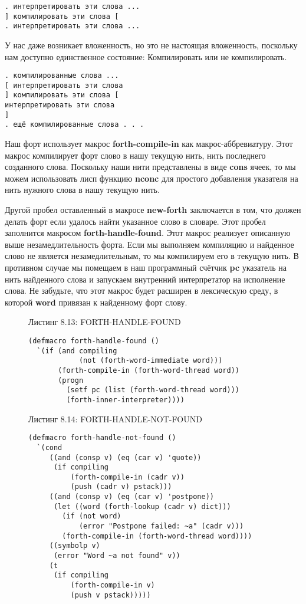 \begin{verbatim}
. интерпретировать эти слова ...
] компилировать эти слова [
. интерпретировать эти слова ...
\end{verbatim}

У нас даже возникает вложенность, но это не настоящая вложенность, поскольку нам доступно единственное состояние: Компилировать или не компилировать.

\begin{verbatim}
. компилированные слова ...
[ интерпретировать эти слова
] компилировать эти слова [
интерпретировать эти слова
]
. ещё компилированные слова . . .
\end{verbatim}

Наш форт использует макрос \textbf{forth-compile-in} как мак\-рос-аб\-бре\-виату\-ру. Этот макрос компилирует форт слово в нашу текущую нить, нить последнего созданного слова. Поскольку наши нити представлены в виде \textbf{cons} ячеек, то мы можем использовать лисп функцию \textbf{nconc} для простого добавления указателя на нить нужного слова в нашу текущую нить.

Другой пробел оставленный в макросе \textbf{new-forth} заключается в том, что должен делать форт если удалось найти указанное слово в словаре. Этот пробел заполнится макросом \textbf{forth-handle-found}. Этот макрос реализует описанную выше незамедлительность форта. Если мы выполняем компиляцию и найденное слово не является незамедлительным, то мы компилируем его в текущую нить. В противном случае мы помещаем в наш программный счётчик \textbf{pc} указатель на нить найденного слова и запускаем внутренний интерпретатор на исполнение слова. Не забудьте, что этот макрос будет расширен в лексическую среду, в которой \textbf{word} привязан к найденному форт слову.

\begin{figure}Листинг 8.13: FORTH-HANDLE-FOUND\label{listing_8.13}
\listbegin
\begin{verbatim}
(defmacro forth-handle-found ()
  `(if (and compiling
            (not (forth-word-immediate word)))
       (forth-compile-in (forth-word-thread word))
       (progn
         (setf pc (list (forth-word-thread word)))
         (forth-inner-interpreter))))
\end{verbatim}
\listend
\end{figure}

\begin{figure}Листинг 8.14: FORTH-HANDLE-NOT-FOUND\label{listing_8.14}
\listbegin
\begin{verbatim}
(defmacro forth-handle-not-found ()
  `(cond
     ((and (consp v) (eq (car v) 'quote))
      (if compiling
          (forth-compile-in (cadr v))
          (push (cadr v) pstack)))
     ((and (consp v) (eq (car v) 'postpone))
      (let ((word (forth-lookup (cadr v) dict)))
        (if (not word)
            (error "Postpone failed: ~a" (cadr v)))
        (forth-compile-in (forth-word-thread word))))
     ((symbolp v)
      (error "Word ~a not found" v))
     (t
      (if compiling
          (forth-compile-in v)
          (push v pstack)))))
\end{verbatim}
\listend
\end{figure}

